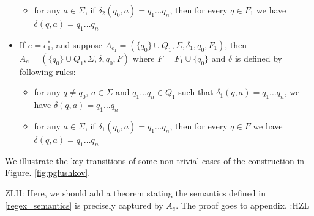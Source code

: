 \documentclass[sigplan,review,anonymous]{acmart}\settopmatter{printfolios=true,printccs=false,printacmref=false}
\newcommand{\zhilei}[1]{\color{violet} {ZLH: #1 :HZL} \color{black}}
\newcommand{\zhilei}[1]{}
\begin{document}
\begin{itemize}
\begin{itemize}
    \item for any $a \in \Sigma$, if $\delta_2 (q_0, a) = q_1 \ldots q_n$,
    then for every $q \in F_1$ we have $\delta (q, a) = q_1 \ldots q_n$
  \end{itemize}
  \item If $e = e_1^{\ast}$, and suppose $A_{e_1} = (\{ q_0 \} \cup Q_1,
  \Sigma, \delta_1, q_0, F_1)$, then $A_e = (\{ q_0 \} \cup Q_1, \Sigma,
  \delta, q_0, F)$ where $F = F_1 \cup \{ q_0 \}$ and $\delta$ is defined by
  following rules:
  \begin{itemize}
    \item for any $q \neq q_0$, $a \in \Sigma$ and $q_1 \ldots q_n \in
    \overline{Q_1}$ such that $\delta_1 (q, a) = q_1 \ldots q_n$, we have
    $\delta (q, a) = q_1 \ldots q_n$
    
    \item for any $a \in \Sigma$, if $\delta_1 (q_0, a) = q_1 \ldots q_n$,
    then for every $q \in F$ we have $\delta (q, a) = q_1 \ldots q_n$
  \end{itemize}
\end{itemize}

We illustrate the key transitions of some non-trivial cases of the construction in Figure. \ref{fig:pglushkov}.

\zhilei{Here, we should add a theorem stating the semantics defined in \ref{regex_semantics} is precisely captured by $A_e$. The proof goes to appendix.}
\end{document}
